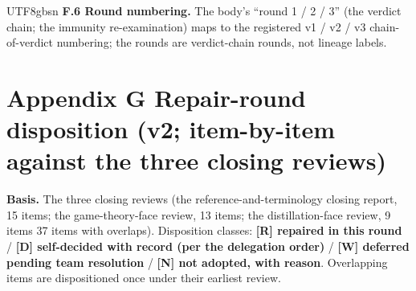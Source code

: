 \documentclass[11pt,letterpaper]{article}
\begin{document}
\begin{CJK}{UTF8}{gbsn}
\textbf{F.6 Round numbering.} The body's ``round 1 / 2 / 3'' (the verdict chain; the immunity re-examination) maps to the registered v1 / v2 / v3 chain-of-verdict numbering; the rounds are verdict-chain rounds, not lineage labels.

\section*{Appendix G \textemdash{} Repair-round disposition (v2; item-by-item against the three closing reviews)}

\textbf{Basis.} The three closing reviews (the reference-and-terminology closing report, 15 items; the game-theory-face review, 13 items; the distillation-face review, 9 items \textemdash{} 37 items with overlaps). Disposition classes: \textbf{[R] repaired in this round} / \textbf{[D] self-decided with record (per the delegation order)} / \textbf{[W] deferred pending team resolution} / \textbf{[N] not adopted, with reason}. Overlapping items are dispositioned once under their earliest review.


\end{CJK}
\end{document}
